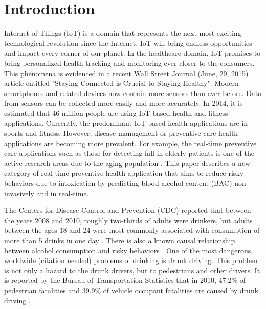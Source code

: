 \section{Introduction}

Internet of Things (IoT) is a domain that represents the next most exciting technological revolution since the Internet. IoT will bring endless opportunities and impact every corner of our planet. In the healthcare domain, IoT promises to bring personalized health tracking and monitoring ever closer to the consumers. This phenomena is evidenced in a recent Wall Street Journal (June, 29, 2015) article entitled "Staying Connected is Crucial to Staying Healthy". Modern smartphones and related devices now contain more sensors than ever before. Data from sensors can be collected more easily and more accurately. In 2014, it is estimated that 46 million people are using IoT-based health and fitness applications. Currently, the predominant IoT-based health applications are in sports and fitness. However, disease management or preventive care health applications are becoming more prevalent. For example, the real-time preventive care applications such as those for detecting fall in elderly patients is one of the active research areas due to the aging population \cite{Tacconi:2011}. This paper describes a new category of real-time preventive health application that aims to reduce risky behaviors due to intoxication by predicting blood alcohol content (BAC) non-invasively and in real-time.

The Centers for Disease Control and Prevention (CDC) reported that between the years 2008 and 2010, roughly two-thirds of adults were drinkers, but adults between the ages 18 and 24 were most commonly associated with consumption of more than 5 drinks in one day \cite{Schoenborn:2013}. There is also a known causal relationship between alcohol consumption and risky behaviors \cite{Assaad:2006}. One of the most dangerous, worldwide (citation needed) problems of drinking is drunk driving. This problem is not only a hazard to the drunk drivers, but to pedestrians and other drivers. It is reported by the Bureau of Transportation Statistics that in 2010, 47.2\% of pedestrian fatalities and 39.9\% of vehicle occupant fatalities are caused by drunk driving \cite{Chambers:2012}.

